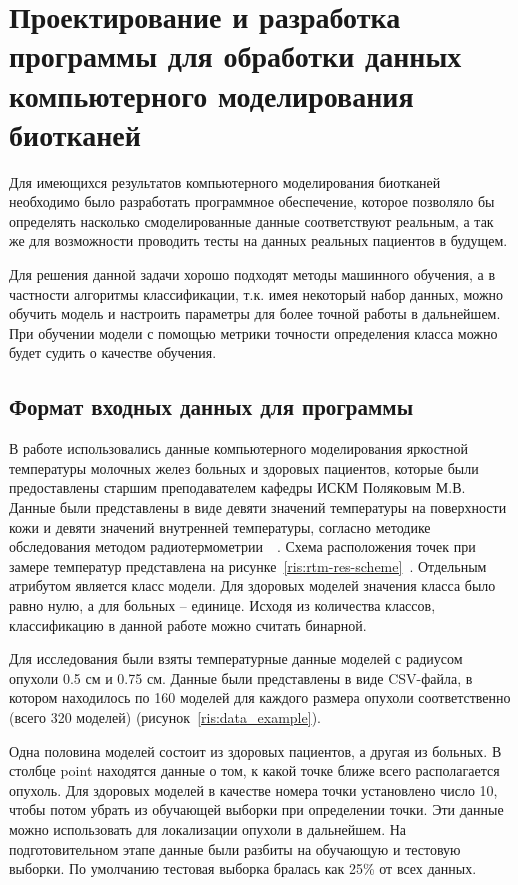 \newpage
\section{\Large Проектирование и разработка программы для обработки данных компьютерного моделирования биотканей}
Для имеющихся результатов компьютерного моделирования биотканей необходимо было разработать программное обеспечение, которое позволяло бы определять насколько смоделированные данные соответствуют реальным, а так же для возможности проводить тесты на данных реальных пациентов в будущем.
\par
Для решения данной задачи хорошо подходят методы машинного обучения, а в частности алгоритмы классификации, т.к. имея некоторый набор данных, можно обучить модель и настроить параметры для более точной работы в дальнейшем. При обучении модели с помощью метрики точности определения класса можно будет судить о качестве обучения.

\subsection{Формат входных данных для программы}
В работе использовались данные компьютерного моделирования яркостной температуры молочных желез больных и здоровых пациентов, которые были предоставлены старшим преподавателем кафедры ИСКМ Поляковым М.В. Данные были представлены в виде девяти значений температуры на поверхности кожи и девяти значений внутренней температуры, согласно методике обследования методом радиотермометрии~\cite{bardati}~\cite{fear2000}. Схема расположения точек при замере температур представлена на рисунке~\ref{ris:rtm-res-scheme}~\cite{vesninSovMicrowave}. Отдельным атрибутом является класс модели. Для здоровых моделей значения класса было равно нулю, а для больных -- единице. Исходя из количества классов, классификацию в данной работе можно считать бинарной.
\\
\par
Для исследования были взяты температурные данные моделей с радиусом опухоли 0.5 см и 0.75 см. Данные были представлены в виде CSV-файла, в котором находилось по 160 моделей для каждого размера опухоли соответственно (всего 320 моделей) (рисунок~\ref{ris:data_example}).
\\
\par
Одна половина моделей состоит из здоровых пациентов, а другая из больных. В столбце point находятся данные о том, к какой точке ближе всего располагается опухоль. Для здоровых моделей в качестве номера точки установлено число 10, чтобы потом убрать из обучающей выборки при определении точки. Эти данные можно использовать для локализации опухоли в дальнейшем. На подготовительном этапе данные были разбиты на обучающую и тестовую выборки. По умолчанию тестовая выборка бралась как 25\% от всех данных.

